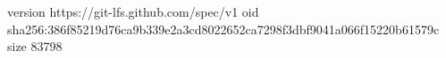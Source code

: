 version https://git-lfs.github.com/spec/v1
oid sha256:386f85219d76ca9b339e2a3cd8022652ca7298f3dbf9041a066f15220b61579c
size 83798
